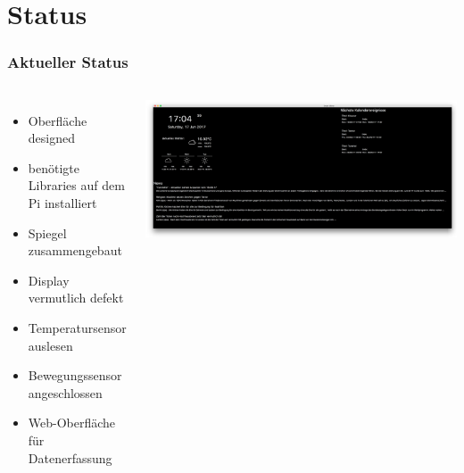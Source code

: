 \documentclass[11pt]{beamer}
\newcommand{\cmark}{\ding{51}}%
\newcommand{\xmark}{\ding{55}}%
\begin{document}
	\section{Status}
	\begin{frame}
		\frametitle{Aktueller Status}
			\begin{columns}
				\column{.5\paperwidth}
					\begin{itemize}
						\item[\cmark] Oberfl\"ache designed
						\item[\cmark] ben\"otigte Libraries auf dem Pi installiert
						\item[\cmark] Spiegel zusammengebaut
						\item[\cmark] Display vermutlich defekt
						\item[\xmark] Temperatursensor auslesen
						\item[\xmark] Bewegungssensor angeschlossen
						\item Web-Oberfl\"ache f\"ur Datenerfassung
					\end{itemize}
				\column{.4\paperwidth}
					\includegraphics[width=.4\paperwidth]{images/titlepage}
			\end{columns}
	\end{frame}
	
\end{document}
